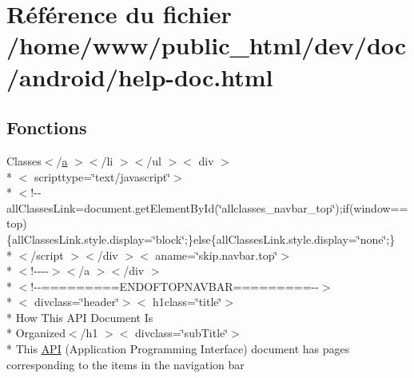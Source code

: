 \hypertarget{help-doc_8html}{\section{Référence du fichier /home/www/public\-\_\-html/dev/doc/android/help-\/doc.html}
\label{help-doc_8html}
}
\subsection*{Fonctions}
\begin{DoxyCompactItemize}
\item 
Classes$<$/\hyperlink{style_8css_a5e8981582017bb8b84c21f148345d1f7}{a} $>$$<$/li $>$$<$/ul $>$$<$ div $>$\\*
$<$ scripttype=\char`\"{}text/javascript\char`\"{}$>$\\*
$<$!-\/-\/all\-Classes\-Link=document.\-get\-Element\-By\-Id(\char`\"{}allclasses\-\_\-navbar\-\_\-top\char`\"{});if(window==top)\{all\-Classes\-Link.\-style.\-display=\char`\"{}block\char`\"{};\}else\{all\-Classes\-Link.\-style.\-display=\char`\"{}none\char`\"{};\}\\*
$<$/script $>$$<$/div $>$$<$ aname=\char`\"{}skip.\-navbar.\-top\char`\"{}$>$\\*
$<$!-\/-\/-\/-\/$>$$<$/a $>$$<$/div $>$\\*
$<$!-\/-\/=========E\-N\-D\-O\-F\-T\-O\-P\-N\-A\-V\-B\-A\-R=========-\/-\/$>$\\*
$<$ divclass=\char`\"{}header\char`\"{}$>$$<$ h1class=\char`\"{}title\char`\"{}$>$\\*
 How This A\-P\-I Document Is \\*
Organized$<$/h1 $>$$<$ divclass=\char`\"{}sub\-Title\char`\"{}$>$\\*
 This \hyperlink{help-doc_8html_a7d3f9452f8a4b1b494eade1a77016691}{A\-P\-I} (Application Programming Interface) document has pages corresponding to the items in the navigation bar
\end{DoxyCompactItemize}
